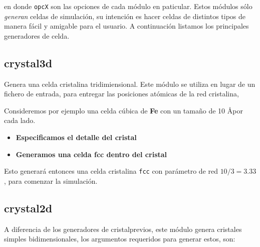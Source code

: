 
en donde \verb|opcX| son las opciones de cada m\'odulo en paticular. Estos m\'odulos s\'olo \textit{generan} celdas de simulaci\'on, su intenci\'on es hacer celdas de distintos tipos de manera f\'acil y amigable para el usuario. A continuaci\'on listamos los principales generadores de celda.

\subsection{crystal3d}
Genera una celda cristalina tridimiensional. Este m\'odulo se utiliza en lugar de un fichero de entrada, para entregar las posiciones at\'omicas de la red cristalina, 


Consideremos por ejemplo una celda c\'ubica de \textbf{Fe} con un tama\~no de 10 \AA por cada lado.

\begin{itemize}
 \item \textbf{Especificamos el detalle del cristal}
 \item \textbf{Generamos una celda  fcc dentro del cristal}
\end{itemize}

Esto generar\'a entonces una celda cristalina \verb|fcc| con par\'ametro de red $10/3 = 3.33$, para comenzar la simulaci\'on.

\subsection{crystal2d}
A diferencia de los generadores de cristalprevios, este m\'odulo genera cristales simples bidimensionales, los argumentos requeridos para generar estos, son:


